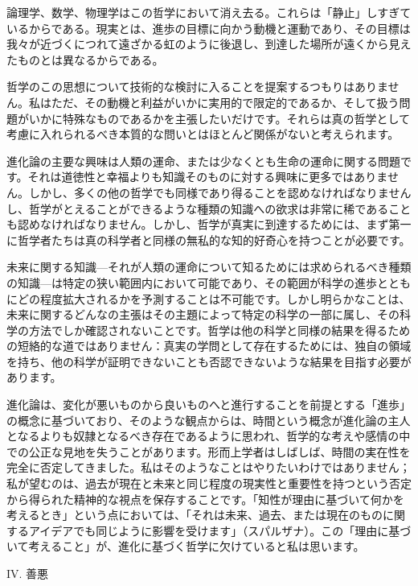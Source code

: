 \documentclass[a4paper,11pt,openany]{ltjsbook}
\begin{document}
論理学、数学、物理学はこの哲学において消え去る。これらは「静止」しすぎているからである。現実とは、進歩の目標に向かう動機と運動であり、その目標は我々が近づくにつれて遠ざかる虹のように後退し、到達した場所が遠くから見えたものとは異なるからである。

哲学のこの思想について技術的な検討に入ることを提案するつもりはありません。私はただ、その動機と利益がいかに実用的で限定的であるか、そして扱う問題がいかに特殊なものであるかを主張したいだけです。それらは真の哲学として考慮に入れられるべき本質的な問いとはほとんど関係がないと考えられます。

進化論の主要な興味は人類の運命、または少なくとも生命の運命に関する問題です。それは道徳性と幸福よりも知識そのものに対する興味に更多ではありません。しかし、多くの他の哲学でも同様であり得ることを認めなければなりませんし、哲学がとえることができるような種類の知識への欲求は非常に稀であることも認めなければなりません。しかし、哲学が真実に到達するためには、まず第一に哲学者たちは真の科学者と同様の無私的な知的好奇心を持つことが必要です。

未来に関する知識—それが人類の運命について知るためには求められるべき種類の知識—は特定の狭い範囲内において可能であり、その範囲が科学の進歩とともにどの程度拡大されるかを予測することは不可能です。しかし明らかなことは、未来に関するどんなの主張はその主題によって特定の科学の一部に属し、その科学の方法でしか確認されないことです。哲学は他の科学と同様の結果を得るための短絡的な道ではありません：真実の学問として存在するためには、独自の領域を持ち、他の科学が証明できないことも否認できないような結果を目指す必要があります。

進化論は、変化が悪いものから良いものへと進行することを前提とする「進歩」の概念に基づいており、そのような観点からは、時間という概念が進化論の主人となるよりも奴隷となるべき存在であるように思われ、哲学的な考えや感情の中での公正な見地を失うことがあります。形而上学者はしばしば、時間の実在性を完全に否定してきました。私はそのようなことはやりたいわけではありません；私が望むのは、過去が現在と未来と同じ程度の現実性と重要性を持つという否定から得られた精神的な視点を保存することです。「知性が理由に基づいて何かを考えるとき」という点においては、「それは未来、過去、または現在のものに関するアイデアでも同じように影響を受けます」（スパルザナ）。この「理由に基づいて考えること」が、進化に基づく哲学に欠けていると私は思います。

IV. 善悪
\end{document}

